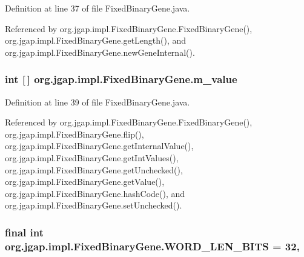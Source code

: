 Definition at line 37 of file Fixed\-Binary\-Gene.\-java.



Referenced by org.\-jgap.\-impl.\-Fixed\-Binary\-Gene.\-Fixed\-Binary\-Gene(), org.\-jgap.\-impl.\-Fixed\-Binary\-Gene.\-get\-Length(), and org.\-jgap.\-impl.\-Fixed\-Binary\-Gene.\-new\-Gene\-Internal().

\hypertarget{classorg_1_1jgap_1_1impl_1_1_fixed_binary_gene_a62abc1f750a00d427ac9a715d11fee42}{
\subsubsection[{m\-\_\-value}]{\setlength{\rightskip}{0pt plus 5cm}int \mbox{[}$\,$\mbox{]} org.\-jgap.\-impl.\-Fixed\-Binary\-Gene.\-m\-\_\-value\hspace{0.3cm}{\ttfamily [private]}}}\label{classorg_1_1jgap_1_1impl_1_1_fixed_binary_gene_a62abc1f750a00d427ac9a715d11fee42}


Definition at line 39 of file Fixed\-Binary\-Gene.\-java.



Referenced by org.\-jgap.\-impl.\-Fixed\-Binary\-Gene.\-Fixed\-Binary\-Gene(), org.\-jgap.\-impl.\-Fixed\-Binary\-Gene.\-flip(), org.\-jgap.\-impl.\-Fixed\-Binary\-Gene.\-get\-Internal\-Value(), org.\-jgap.\-impl.\-Fixed\-Binary\-Gene.\-get\-Int\-Values(), org.\-jgap.\-impl.\-Fixed\-Binary\-Gene.\-get\-Unchecked(), org.\-jgap.\-impl.\-Fixed\-Binary\-Gene.\-get\-Value(), org.\-jgap.\-impl.\-Fixed\-Binary\-Gene.\-hash\-Code(), and org.\-jgap.\-impl.\-Fixed\-Binary\-Gene.\-set\-Unchecked().

\hypertarget{classorg_1_1jgap_1_1impl_1_1_fixed_binary_gene_ab3e70c8e8c88370485c33fb937db2eda}{
\subsubsection[{W\-O\-R\-D\-\_\-\-L\-E\-N\-\_\-\-B\-I\-T\-S}]{\setlength{\rightskip}{0pt plus 5cm}final int org.\-jgap.\-impl.\-Fixed\-Binary\-Gene.\-W\-O\-R\-D\-\_\-\-L\-E\-N\-\_\-\-B\-I\-T\-S = 32\hspace{0.3cm}{\ttfamily [static]}, {\ttfamily [private]}}}\label{classorg_1_1jgap_1_1impl_1_1_fixed_binary_gene_ab3e70c8e8c88370485c33fb937db2eda}


